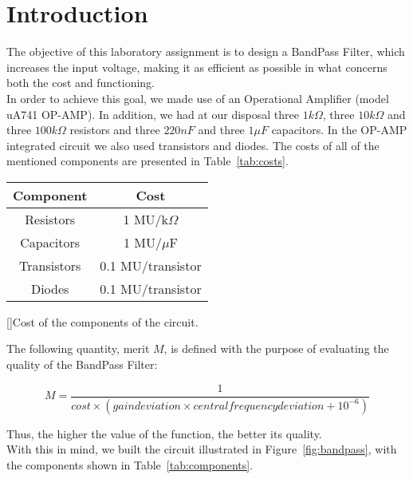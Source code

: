 \section{Introduction}
\label{sec:introduction}

The objective of this laboratory assignment is to design a BandPass Filter, which increases the input voltage, making it as efficient as possible in what concerns both the cost and functioning. \\

In order to achieve this goal, we made use of an Operational Amplifier (model uA741 OP-AMP). In addition, we had at our disposal three $1k\Omega$, three $10k\Omega$ and three $100k\Omega$ resistors and three $220 nF$ and three $1 \mu F$ capacitors. In the OP-AMP integrated circuit we also used transistors and diodes. The costs of all of the mentioned components are presented in Table~\ref{tab:costs}.

\begin{center}
\begin{tabular}{ | c | c | }
\hline
\textbf{Component} & \textbf{Cost} \\
\hline
Resistors & 1 MU/k$\Omega$ \\  
Capacitors & 1 MU/$\mu$F \\
Transistors & 0.1 MU/transistor \\
Diodes & 0.1 MU/transistor \\
\hline   
\end{tabular}
[]{Cost of the components of the circuit.}
\label{tab:costs}
\end{center}

The following quantity, merit $M$, is defined with the purpose of evaluating the quality of the BandPass Filter:

\vspace{-2mm}

\begin{equation}
  M = \frac{1}{cost \times (gain deviation \times central frequency deviation + 10^{-6})}
\end{equation}

\vspace{2mm}

Thus, the higher the value of the function, the better its quality.\\

With this in mind, we built the circuit illustrated in Figure~\ref{fig:bandpass}, with the components shown in Table~\ref{tab:components}.

